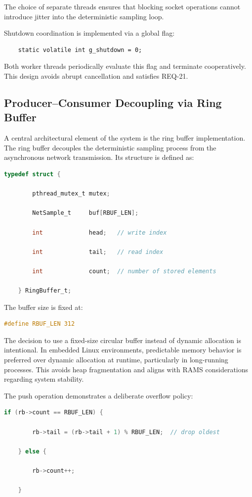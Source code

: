 The choice of separate threads ensures that blocking socket operations cannot introduce jitter into the deterministic sampling loop.

Shutdown coordination is implemented via a global flag:

\begin{lstlisting}
	static volatile int g_shutdown = 0;
\end{lstlisting}

Both worker threads periodically evaluate this flag and terminate cooperatively. This design avoids abrupt cancellation and satisfies REQ-21.

\subsection{Producer--Consumer Decoupling via Ring Buffer}

A central architectural element of the system is the ring buffer implementation. The ring buffer decouples the deterministic sampling process from the asynchronous network transmission. Its structure is defined as:

\begin{lstlisting}[language=C]
	typedef struct {
		
		pthread_mutex_t mutex;
		
		NetSample_t     buf[RBUF_LEN];
		
		int             head;   // write index
		
		int             tail;   // read index
		
		int             count;  // number of stored elements
		
	} RingBuffer_t;
\end{lstlisting}

The buffer size is fixed at:

\begin{lstlisting}[language=C]
	#define RBUF_LEN 312
\end{lstlisting}

The decision to use a fixed-size circular buffer instead of dynamic allocation is intentional. In embedded Linux environments, predictable memory behavior is preferred over dynamic allocation at runtime, particularly in long-running processes. This avoids heap fragmentation and aligns with RAMS considerations regarding system stability.

The push operation demonstrates a deliberate overflow policy:

\begin{lstlisting}[language=C]
	if (rb->count == RBUF_LEN) {
		
		rb->tail = (rb->tail + 1) % RBUF_LEN;  // drop oldest
		
	} else {
		
		rb->count++;
		
	}
\end{lstlisting}

